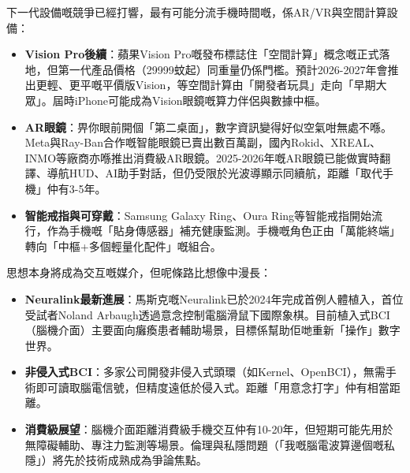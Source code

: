 


下一代設備嘅競爭已經打響，最有可能分流手機時間嘅，係AR/VR與空間計算設備：

\begin{itemize}
  \item \textbf{Vision Pro後續}：蘋果Vision Pro嘅發布標誌住「空間計算」概念嘅正式落地，但第一代產品價格（29999蚊起）同重量仍係門檻。預計2026-2027年會推出更輕、更平嘅平價版Vision，等空間計算由「開發者玩具」走向「早期大眾」。屆時iPhone可能成為Vision眼鏡嘅算力伴侶與數據中樞。
  \item \textbf{AR眼鏡}：畀你眼前開個「第二桌面」，數字資訊變得好似空氣咁無處不喺。Meta與Ray-Ban合作嘅智能眼鏡已賣出數百萬副，國內Rokid、XREAL、INMO等廠商亦喺推出消費級AR眼鏡。2025-2026年嘅AR眼鏡已能做實時翻譯、導航HUD、AI助手對話，但仍受限於光波導顯示同續航，距離「取代手機」仲有3-5年。
  \item \textbf{智能戒指與可穿戴}：Samsung Galaxy Ring、Oura Ring等智能戒指開始流行，作為手機嘅「貼身傳感器」補充健康監測。手機嘅角色正由「萬能終端」轉向「中樞+多個輕量化配件」嘅組合。
\end{itemize}


思想本身將成為交互嘅媒介，但呢條路比想像中漫長：

\begin{itemize}
  \item \textbf{Neuralink最新進展}：馬斯克嘅Neuralink已於2024年完成首例人體植入，首位受試者Noland Arbaugh透過意念控制電腦滑鼠下國際象棋。目前植入式BCI（腦機介面）主要面向癱瘓患者輔助場景，目標係幫助佢哋重新「操作」數字世界。
  \item \textbf{非侵入式BCI}：多家公司開發非侵入式頭環（如Kernel、OpenBCI），無需手術即可讀取腦電信號，但精度遠低於侵入式。距離「用意念打字」仲有相當距離。
  \item \textbf{消費級展望}：腦機介面距離消費級手機交互仲有10-20年，但短期可能先用於無障礙輔助、專注力監測等場景。倫理與私隱問題（「我嘅腦電波算邊個嘅私隱」）將先於技術成熟成為爭論焦點。
\end{itemize}


